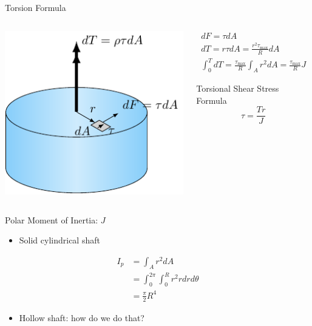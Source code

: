 \documentclass[10pt, svgnames]{beamer}
\begin{document}
\begin{frame}[label={sec:org7c95757}]{Torsion Formula}
\begin{columns}
\begin{column}{0.5\columnwidth}
\begin{center}
\includegraphics[width=.9\linewidth]{pictures/torsion-formula.pdf}
\end{center}
\end{column}

\begin{column}{0.5\columnwidth}
\begin{gather*}
  dF = \tau dA \\
  dT = r \tau dA = \frac{r^2 \tau_{\max}}{R} dA \\
  \int_0^T dT = \frac{ \tau_{\max} }{R} \int_A r^2 dA = \frac{ \tau_{\max}}{R} J
\end{gather*}

\begin{block}{\small Torsional Shear Stress Formula}
  $$ \tau = \frac{ Tr }{J} $$
\end{block}
\end{column}
\end{columns}
\end{frame}

\begin{frame}[label={sec:org53e7614}]{Polar Moment of Inertia: \(J\)}
\begin{itemize}
\item Solid cylindrical shaft
\end{itemize}

\begin{align*}
  I_p &= \int_A r^2 dA \\
      &= \int_0^{2\pi} \int_0^R r^2 r dr d\theta \\
      &= \frac{\pi}{2} R^4
\end{align*}

\begin{itemize}
\item Hollow shaft: how do we do that?
\end{itemize}
\end{frame}
\end{document}
